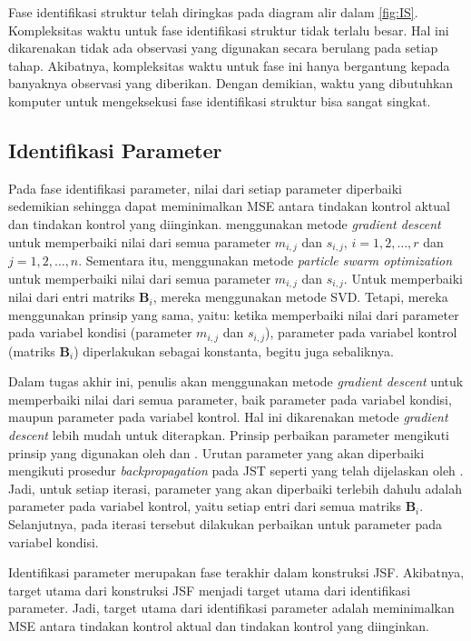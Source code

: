 \noindent Fase identifikasi struktur telah diringkas pada diagram alir dalam \ref{fig:IS}. Kompleksitas waktu untuk fase identifikasi struktur tidak terlalu besar. Hal ini dikarenakan tidak ada observasi yang digunakan secara berulang pada setiap tahap. Akibatnya, kompleksitas waktu untuk fase ini hanya bergantung kepada banyaknya observasi yang diberikan. Dengan demikian, waktu yang dibutuhkan komputer untuk mengeksekusi fase identifikasi struktur bisa sangat singkat. 

\subsection{Identifikasi Parameter}
\noindent Pada fase identifikasi parameter, nilai dari setiap parameter diperbaiki sedemikian sehingga dapat meminimalkan MSE antara tindakan kontrol aktual dan tindakan kontrol yang diinginkan.  menggunakan metode \emph{gradient descent} untuk memperbaiki nilai dari semua parameter $m_{i,j}$ dan $s_{i,j}$, $i=1,2,\ldots,r$ dan $j=1,2,\ldots,n$. Sementara itu,  menggunakan metode \emph{particle swarm optimization} untuk memperbaiki nilai dari semua parameter $m_{i,j}$ dan $s_{i,j}$. Untuk memperbaiki nilai dari entri matriks $\mathbf{B}_i$, mereka menggunakan metode SVD. Tetapi, mereka menggunakan prinsip yang sama, yaitu: ketika memperbaiki nilai dari parameter pada variabel kondisi (parameter $m_{i,j}$ dan $s_{i,j}$), parameter pada variabel kontrol (matriks $\mathbf{B}_i$) diperlakukan sebagai konstanta, begitu juga sebaliknya.

\noindent Dalam tugas akhir ini, penulis akan menggunakan metode \emph{gradient descent} untuk memperbaiki nilai dari semua parameter, baik parameter pada variabel kondisi, maupun parameter pada variabel kontrol. Hal ini dikarenakan metode \textit{gradient descent} lebih mudah untuk diterapkan. Prinsip perbaikan parameter mengikuti prinsip yang digunakan oleh  dan . Urutan parameter yang akan diperbaiki mengikuti prosedur \emph{backpropagation} pada JST seperti yang telah dijelaskan oleh . Jadi, untuk setiap iterasi, parameter yang akan diperbaiki terlebih dahulu adalah parameter pada variabel kontrol, yaitu setiap entri dari semua matriks $\mathbf{B}_i$. Selanjutnya, pada iterasi tersebut dilakukan perbaikan untuk parameter pada variabel kondisi. 

\noindent Identifikasi parameter merupakan fase terakhir dalam konstruksi JSF. Akibatnya, target utama dari konstruksi JSF menjadi target utama dari identifikasi parameter. Jadi, target utama dari identifikasi parameter adalah meminimalkan MSE antara tindakan kontrol aktual dan tindakan kontrol yang diinginkan.

